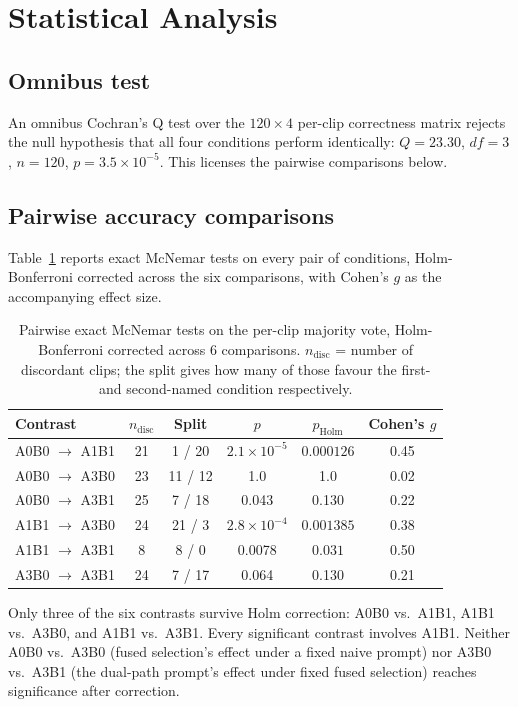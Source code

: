 \section{Statistical Analysis}
\label{sec:results-stats}

\subsection{Omnibus test}
An omnibus Cochran's Q test over the $120\times4$ per-clip correctness matrix rejects the null hypothesis that all four conditions perform identically: $Q=23.30$, $df=3$, $n=120$, $p=3.5\times10^{-5}$. This licenses the pairwise comparisons below.

\subsection{Pairwise accuracy comparisons}
Table~\ref{tab:mcnemar} reports exact McNemar tests on every pair of conditions, Holm-Bonferroni corrected across the six comparisons, with Cohen's $g$ as the accompanying effect size.

\begin{table}[htbp]
\centering
\caption[Pairwise McNemar tests, Holm-corrected]{Pairwise exact McNemar tests on the per-clip majority vote, Holm-Bonferroni corrected across 6 comparisons. $n_\text{disc}$ = number of discordant clips; the split gives how many of those favour the first- and second-named condition respectively.}
\label{tab:mcnemar}
\begin{tabular}{@{}lccccc@{}}
\toprule
Contrast & $n_\text{disc}$ & Split & $p$ & $p_\text{Holm}$ & Cohen's $g$ \\
\midrule
A0B0 $\to$ A1B1 & 21 & 1 / 20 & $2.1\times10^{-5}$ & $\mathbf{0.000126}$ & 0.45 \\
A0B0 $\to$ A3B0 & 23 & 11 / 12 & 1.0 & 1.0 & 0.02 \\
A0B0 $\to$ A3B1 & 25 & 7 / 18 & 0.043 & 0.130 & 0.22 \\
A1B1 $\to$ A3B0 & 24 & 21 / 3 & $2.8\times10^{-4}$ & $\mathbf{0.001385}$ & 0.38 \\
A1B1 $\to$ A3B1 & 8 & 8 / 0 & 0.0078 & $\mathbf{0.031}$ & 0.50 \\
A3B0 $\to$ A3B1 & 24 & 7 / 17 & 0.064 & 0.130 & 0.21 \\
\bottomrule
\end{tabular}
\end{table}

Only three of the six contrasts survive Holm correction: A0B0 vs.\ A1B1, A1B1 vs.\ A3B0, and A1B1 vs.\ A3B1. Every significant contrast involves A1B1. Neither A0B0 vs.\ A3B0 (fused selection's effect under a fixed naive prompt) nor A3B0 vs.\ A3B1 (the dual-path prompt's effect under fixed fused selection) reaches significance after correction.

